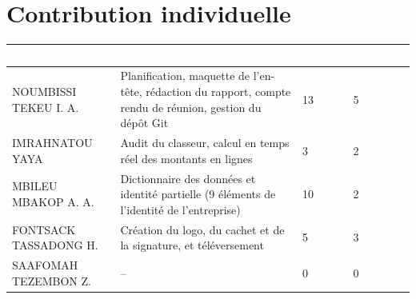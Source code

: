 \documentclass[11pt,a4paper]{article}
\newcommand{\entete}[1]{\textcolor{white}{\textbf{#1}}}
\begin{document}
\section{Contribution individuelle}

\begin{longtable}{|L{3.8cm}|L{6.6cm}|C{1.5cm}|C{1.7cm}|}
\hline
{}
\entete{Membres} & \entete{Tâches réalisées} & \entete{Heures} &
\entete{Commits} \\
\hline
\endhead
NOUMBISSI TEKEU I. A. & Planification, maquette de l'en-tête, rédaction du
  rapport, compte rendu de réunion, gestion du dépôt Git & 13 & 5 \\ \hline
IMRAHNATOU YAYA & Audit du classeur, calcul en temps réel des montants en
  lignes & 3 & 2 \\ \hline
MBILEU MBAKOP A. A. & Dictionnaire des données et identité partielle
  (9 éléments de l'identité de l'entreprise) & 10 & 2 \\ \hline
FONTSACK TASSADONG H. & Création du logo, du cachet et de la signature, et
  téléversement & 5 & 3 \\ \hline
SAAFOMAH TEZEMBON Z. & -- & 0 & 0 \\ \hline
\end{longtable}
\end{document}
